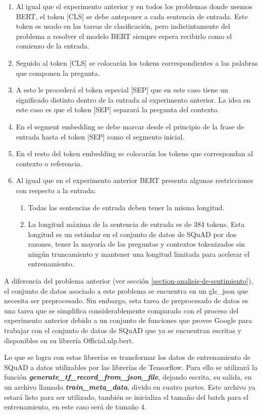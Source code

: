 \begin{enumerate}
    \item Al igual que el experimento anterior y en todos los problemas donde usemos BERT, el token [CLS] se debe anteponer a cada sentencia de entrada. Este token es usado en las tareas de clasificación, pero indistintamente del problema a resolver el modelo BERT siempre espera recibirlo como el comienzo de la entrada.
    \item Seguido al token [CLS] se colocarán los tokens correspondientes a las palabras que componen la pregunta.
    \item A esto le procederá el token especial [SEP] que en este caso tiene un significado distinto dentro de la entrada al experimento anterior. La idea en este caso es que el token [SEP] separará la pregunta del contexto.
    \item En el segment embedding se debe marcar desde el principio de la frase de entrada hasta el token [SEP] como el segmento inicial.
    \item En el resto del token embedding se colocarán los tokens que correspondan al contexto o referencia.
    \item Al igual que en el experimento anterior BERT presenta algunas restricciones con respecto a la entrada:
    \begin{enumerate}
    \item Todas las sentencias de entrada deben tener la misma longitud.
    \item La longitud máxima de la sentencia de entrada es de 384 tokens. Esta longitud es un estándar en el conjunto de datos de SQuAD por dos razones, tener la mayoría de las preguntas y contextos tokenizados sin ningún truncamiento y mantener una longitud limitada para acelerar el entrenamiento.
    \end{enumerate}
\end{enumerate}

A diferencia del problema anterior (ver sección \ref{section-analisis-de-sentimiento}), el conjunto de datos asociado a este problema se encuentra en un \gls{gls_json} que necesita ser preprocesado. Sin embargo, esta tarea de preprocesado de datos es una tarea que se simplifica considerablemente comparado con el proceso del experimento anterior debido a un conjunto de funciones que provee Google para trabajar con el conjunto de datos de SQuAD que ya se encuentran escritas y disponibles en su librería Official.nlp.bert. 

Lo que se logra con estas librerías es transformar los datos de entrenamiento de SQuAD a datos utilizables por las librerías de Tensorflow. Para ello se utilizará la función \textbf{\textit{generate\_tf\_record\_from\_json\_file}}, dejando escrita, su salida, en un
archivo llamado \textbf{\textit{train\_meta\_data}}, divido en cuatro partes. Este archivo ya estará
listo para ser utilizado, también se inicializa el tamaño del batch para el entrenamiento, en este caso será de tamaño 4.

